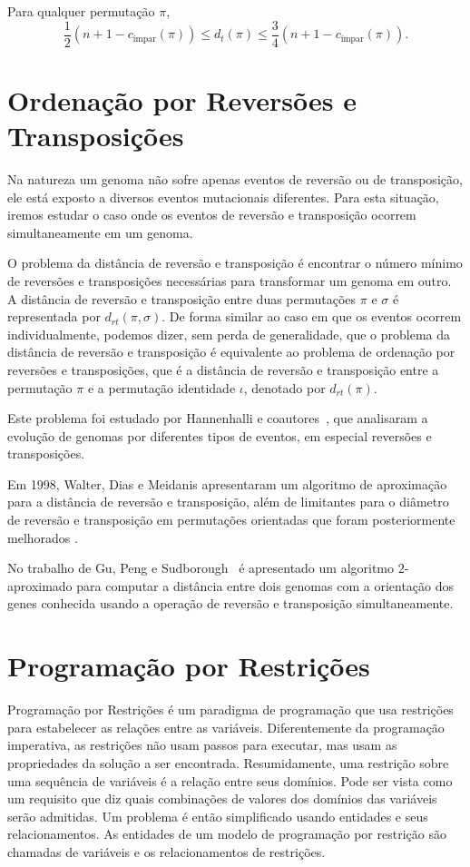 \begin{teo} 
  \label{teo:trans_cg_bound} 
  Para qualquer permutação $\pi$, 
  \[ 
  \frac{1}{2}(n + 1 - c_{\text{ímpar}}(\pi)) \leq d_t(\pi) \leq \frac{3}{4} (n
  + 1 - c_{\text{ímpar}}(\pi)).
  \]
\end{teo}

\section{Ordenação por Reversões e Transposições}
\label{sec:rev_trans}
Na natureza um genoma não sofre apenas eventos de reversão ou de
transposição, ele está exposto a diversos eventos mutacionais
diferentes. Para esta situação, iremos estudar o caso onde os eventos de
reversão e transposição ocorrem simultaneamente em um genoma.

O problema da distância de reversão e transposição é encontrar o número
mínimo de reversões e transposições necessárias para transformar um
genoma em outro. A distância de reversão e transposição entre duas
permutações $\pi$ e $\sigma$ é representada por $d_{rt}(\pi, \sigma)$.
De forma similar ao caso em que os eventos ocorrem individualmente,
podemos dizer, sem perda de generalidade, que o problema da distância de
reversão e transposição é equivalente ao problema de ordenação por
reversões e transposições, que é a distância de reversão e transposição
entre a permutação $\pi$ e a permutação identidade $\iota$, denotado por
$d_{rt}(\pi)$.

Este problema foi estudado por Hannenhalli e
coautores~\cite{HannenhalliChappeyKooninPevzner*1995}, que analisaram a
evolução de genomas por diferentes tipos de eventos, em especial
reversões e transposições. 

Em 1998, Walter, Dias e Meidanis \cite{WalterDiasMeidanis*1998}
apresentaram um algoritmo de aproximação para a distância de reversão e
transposição, além de limitantes para o diâmetro de reversão e
transposição em permutações orientadas que foram posteriormente
melhorados \cite{MeidanisWalterDias*2002}.

No trabalho de Gu, Peng e Sudborough~\cite{GuPengSudbourough*1999} é
apresentado um algoritmo $2$-aproximado para computar a distância entre
dois genomas com a orientação dos genes conhecida usando a operação de
reversão e transposição simultaneamente.

\section{Programação por Restrições}
\label{sec:def_cp}
Programação por Restrições é um paradigma de programação que usa
restrições para estabelecer as relações entre as variáveis.
Diferentemente da programação imperativa, as restrições não usam passos
para executar, mas usam as propriedades da solução a ser encontrada.
Resumidamente, uma restrição sobre uma sequência de variáveis é a
relação entre seus domínios. Pode ser vista como um requisito que diz
quais combinações de valores dos domínios das variáveis serão admitidas.
Um problema é então simplificado usando entidades e seus
relacionamentos. As entidades de um modelo de programação por restrição
são chamadas de variáveis e os relacionamentos de restrições.

